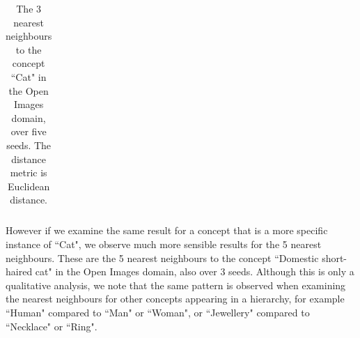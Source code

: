 \begin{table}[H]
\begin{tabular}{@{}llll@{}}
\end{tabular}
\centering
\label{table:1}
\caption{The 3 nearest neighbours to the concept ``Cat" in the Open Images domain, over five seeds. The distance metric is Euclidean distance.}
\end{table}

However if we examine the same result for a concept that is a more specific instance of ``Cat", we observe much more sensible results for the 5 nearest neighbours. These are the 5 nearest neighbours to the concept ``Domestic short-haired cat" in the Open Images domain, also over 3 seeds. Although this is only a qualitative analysis, we note that the same pattern is observed when examining the nearest neighbours for other concepts appearing in a hierarchy, for example ``Human" compared to ``Man" or ``Woman", or ``Jewellery" compared to ``Necklace" or ``Ring". 

